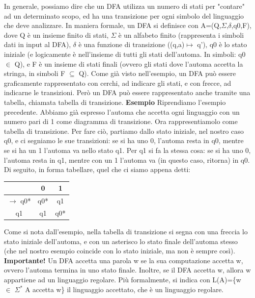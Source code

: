 \documentclass[]{article}
\begin{document}
			In generale, possiamo dire che un DFA utilizza un numero di stati per "contare" ad un determinato scopo, ed ha una transizione per ogni simbolo del linguaggio che deve analizzare.\newline
			\newline
			In maniera formale, un DFA si definisce con A=(Q,$\Sigma$,$\delta$,q0,F), dove Q è un insieme finito di stati, $\Sigma$ è un alfabeto finito (rappresenta i simboli dati in input al DFA), $\delta$ è una funzione di transizione ((q,a)$\mapsto$ q'), q0 è lo stato iniziale (e logicamente è nell'insieme di tutti gli stati dell'automa. In simboli: q0 $\in$ Q), e F è un insieme di stati finali (ovvero gli stati dove l'automa accetta la stringa, in simboli F $\subseteq$ Q).
			\newline
			\newline
			Come già visto nell'esempio, un DFA può essere graficamente rappresentato con cerchi, ad indicare gli stati, e con frecce, ad indicarne le transizioni. Però un DFA può essere rappresentato anche tramite una tabella, chiamata tabella di transizione.
			\newline
			\newline
			\textbf{Esempio} Riprendiamo l'esempio precedente. \newline
			Abbiamo già espresso l'automa che accetta ogni linguaggio con un numero pari di 1 come diagramma di transizione. Ora rappresentiamolo come tabella di transizione. \newline
			Per fare ciò, partiamo dallo stato iniziale, nel nostro caso q0, e ci segniamo le sue transizioni: se si ha uno 0, l'automa resta in q0, mentre se si ha un 1 l'automa va nello stato q1. Per q1 si fa la stessa cosa: se si ha uno 0, l'automa resta in q1, mentre con un 1 l'automa va (in questo caso, ritorna) in q0.\newline
			Di seguito, in forma tabellare, quel che ci siamo appena detti: \newline
			\begin{center}
				\begin{tabular}{c|c|c}
					 &0&1 \\
					 \hline
					$\rightarrow$ q0* &q0*&q1 \\
					q1&q1&q0*
				\end{tabular}
			\end{center}
			Come si nota dall'esempio, nella tabella di transizione si segna con una freccia lo stato iniziale dell'automa, e con un asterisco lo stato finale dell'automa stesso (che nel nostro esempio coincide con lo stato iniziale, ma non è sempre così).\newline
			\textbf{Importante!} Un DFA accetta una parola w se la sua computazione accetta w, ovvero l'automa termina in uno stato finale. Inoltre, se il DFA accetta w, allora w appartiene ad un linguaggio regolare. \newline
			Più formalmente, si indica con L(A)=\{w $\in$ $\Sigma$$^*$  \textbar A accetta w\} il linguaggio accettato, che è un linguaggio regolare.
\end{document}
